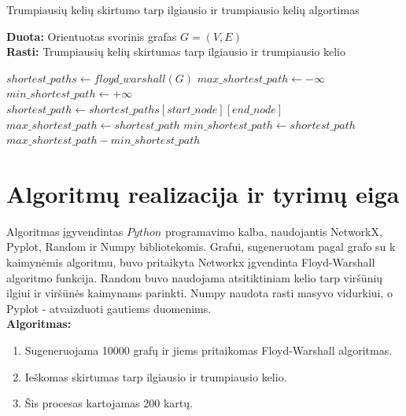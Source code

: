 \documentclass[bibliography=totoc]{article}
\begin{document}
\begin{algorithm}[h]
    \caption{Trumpiausių kelių skirtumo tarp ilgiausio ir trumpiausio kelių algortimas }
    \textbf{Duota:} Orientuotas svorinis grafas $G=(V,E)$\\
    \textbf{Rasti:} Trumpiausių kelių skirtumas tarp ilgiausio ir trumpiausio kelio
    \begin{algorithmic}[1]
        \STATE $shortest\_paths \gets floyd\_warshall(G)$
        \STATE $max\_shortest\_path \gets -\infty$
        \STATE $min\_shortest\_path \gets +\infty$
                    \STATE $shortest\_path \gets shortest\_paths[start\_node][end\_node]$
                        \STATE $max\_shortest\_path \gets shortest\_path$
                    \ENDIF
                        \STATE $min\_shortest\_path \gets shortest\_path$
                    \ENDIF
                \ENDIF
            \ENDFOR
        \ENDFOR
        \RETURN $max\_shortest\_path - min\_shortest\_path$
    \end{algorithmic}
\end{algorithm}

\newpage
\section{Algoritmų realizacija ir tyrimų eiga}
Algoritmas įgyvendintas $Python$ programavimo kalba, naudojantis NetworkX, Pyplot, Random ir Numpy bibliotekomis. Grafui, sugeneruotam pagal grafo su k kaimynėmis algoritmu, buvo pritaikyta Networkx įgvendinta Floyd-Warshall algoritmo funkcija. Random buvo naudojama atsitiktiniam kelio tarp viršūnių ilgiui ir viršūnės kaimynams parinkti. Numpy naudota rasti masyvo vidurkiui, o Pyplot - atvaizduoti gautiems duomenims.\\

\textbf{Algoritmas:}
\begin{enumerate}
    \item Sugeneruojama 10000 grafų ir jiems pritaikomas Floyd-Warshall algoritmas.
    \item Ieškomas skirtumas tarp ilgiausio ir trumpiausio kelio.
    \item Šis procesas kartojamas 200 kartų.
\end{enumerate}
\end{document}
